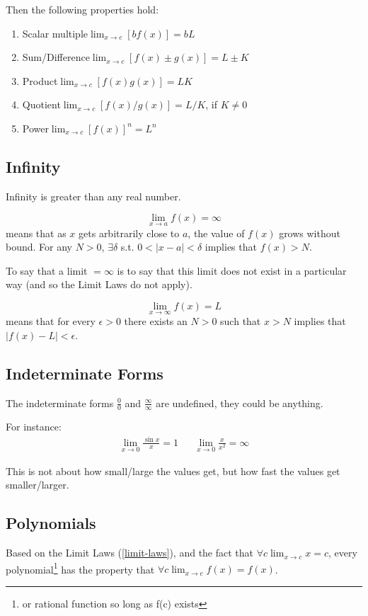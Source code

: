 \documentclass{article}
\begin{document}
Then the following properties hold:
\begin{enumerate}
    \item Scalar multiple\quad$\lim_{x\to c}\limits\left[bf(x)\right] = bL$
    \item Sum/Difference\quad$\lim_{x\to c}\limits\left[f(x)\pm g(x)\right] = L \pm K$
    \item Product\quad$\lim_{x\to c}\limits\left[f(x)g(x)\right] = LK$
    \item Quotient\quad$\lim_{x\to c}\limits\left[f(x) / g(x)\right] = L / K$, if $K\ne 0$
    \item Power\quad$\lim_{x\to c}\limits\left[f(x)\right]^n = L^n$
\end{enumerate}

\subsection{Infinity}
Infinity is greater than any real number.

$$\lim_{x\to a}f(x) = \infty$$ means that as $x$ gets arbitrarily close to $a$, the value of $f(x)$ grows without bound. For any $N>0$, $\exists\delta$ s.t. $0 < |x-a| < \delta$ implies that $f(x) > N$.

To say that a limit $= \infty$ is to say that this limit does not exist in a particular way (and so the Limit Laws do not apply).

$$\lim_{x\to\infty}f(x) = L$$ means that for every $\epsilon > 0$ there exists an $N > 0$ such that $x>N$ implies that $|f(x)-L|<\epsilon$.

\subsection{Indeterminate Forms}
The indeterminate forms $\frac{0}{0}$ and $\frac{\infty}{\infty}$ are undefined, they could be anything.

For instance:
\begin{align*}
\lim_{x\to 0} \frac{\sin{x}}{x} = 1 & & \lim_{x\to 0}\frac{x}{x^2} = \infty
\end{align*}

This is not about how small/large the values get, but how fast the values get smaller/larger.

\subsection{Polynomials}
Based on the Limit Laws (\ref{limit-laws}), and the fact that $\forall c \lim_{x\to c}\limits x = c$, every polynomial\footnote{or rational function so long as f(c) exists} has the property that $\forall c \lim_{x\to c}\limits f(x)  = f(x)$.
\end{document}
